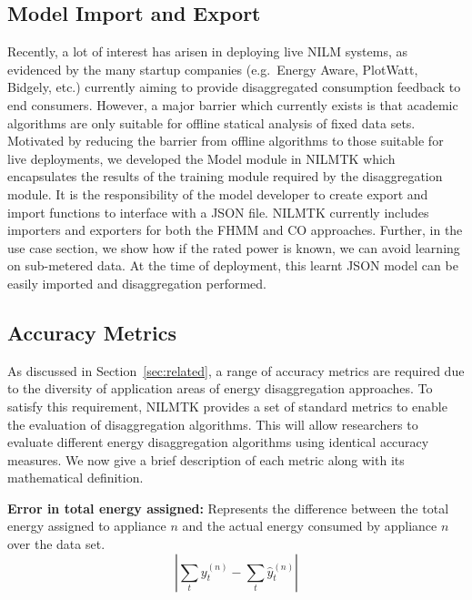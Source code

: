 \documentclass{sig-alternate}
\newcommand{\redcolor}[1]{\textcolor{red}{#1}}
\newcommand{\secref}[1]{Section~\ref{#1}}
\begin{document}
\subsection{Model Import and Export}


\noindent
Recently, a lot of interest has arisen in deploying live NILM systems, as evidenced by the many startup companies (e.g.\ Energy Aware, PlotWatt, Bidgely, etc.) currently aiming to provide disaggregated consumption feedback to end consumers. However, a major barrier which currently exists is that academic algorithms are only suitable for offline statical analysis of fixed data sets. Motivated by reducing the barrier from offline algorithms to those suitable for live deployments, we developed the Model module in NILMTK which encapsulates the results of the training module required by the disaggregation module. It is the responsibility of the model developer to create export and import functions to interface with a JSON file. NILMTK currently includes importers and exporters for both the FHMM and CO approaches. Further, in the use case section, we show how if the rated power is known, we can avoid learning on sub-metered data. At the time of deployment, this learnt JSON model can be easily imported and disaggregation performed.

\subsection{Accuracy Metrics}

\noindent
As discussed in \secref{sec:related}, a range of accuracy metrics are required due to the diversity of application areas of energy disaggregation approaches. To satisfy this requirement, NILMTK provides a set of standard metrics to enable the evaluation of disaggregation algorithms. This will allow researchers to evaluate different energy disaggregation algorithms using identical accuracy measures. We now give a brief description of each metric along with its mathematical definition.

\textbf{Error in total energy assigned:} Represents the difference between the total energy assigned to appliance $n$ and the actual energy consumed by appliance $n$ over the data set.
\begin{equation}
        \left | \sum_t y^{(n)}_t - \sum_t \hat{y}^{(n)}_t \right |
\end{equation}
\end{document}
